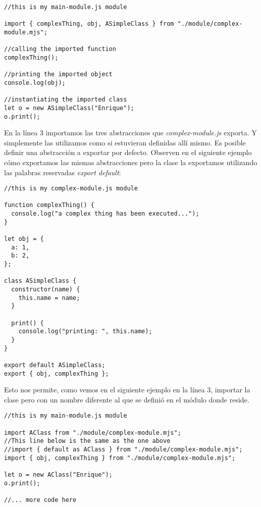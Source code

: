 \documentclass[a4paper, oneside, titlepage, 12pt]{paper}
\begin{document}
\begin{verbatim}
//this is my main-module.js module

import { complexThing, obj, ASimpleClass } from "./module/complex-module.mjs";

//calling the imported function
complexThing();

//printing the imported object
console.log(obj);

//instantiating the imported class
let o = new ASimpleClass("Enrique");
o.print();
\end{verbatim}

En la línea 3 importamos las tres abstracciones que \textit{complex-module.js} exporta. Y simplemente las utilizamos como si estuvieran definidas allí mismo. Es posible definir una abstracción a exportar por defecto. Observen en el siguiente ejemplo cómo exportamos las mismas abstracciones pero la clase la exportamos utilizando las palabras reservadas \textit{export default}:

\begin{verbatim}
//this is my complex-module.js module

function complexThing() {
  console.log("a complex thing has been executed...");
}

let obj = {
  a: 1,
  b: 2,
};

class ASimpleClass {
  constructor(name) {
    this.name = name;
  }

  print() {
    console.log("printing: ", this.name);
  }
}

export default ASimpleClass;
export { obj, complexThing };
\end{verbatim}

Esto nos permite, como vemos en el siguiente ejemplo en la línea 3, importar la clase pero con un nombre diferente al que se definió en el módulo donde reside.

\begin{verbatim}
//this is my main-module.js module

import AClass from "./module/complex-module.mjs";
//This line below is the same as the one above
//import { default as AClass } from "./module/complex-module.mjs";
import { obj, complexThing } from "./module/complex-module.mjs";

let o = new AClass("Enrique");
o.print();

//... more code here
\end{verbatim}
\end{document}
